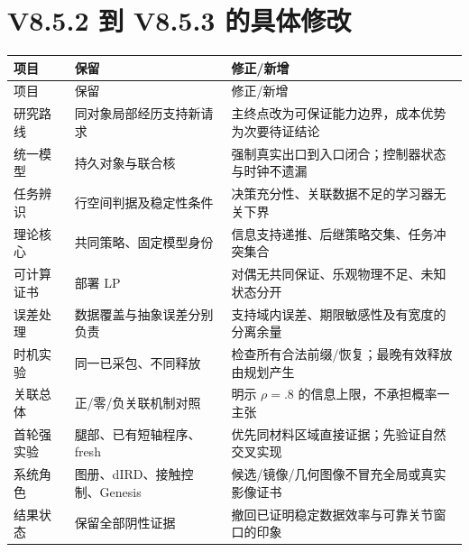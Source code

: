 \documentclass[11pt,a4paper,fontset=fandol]{ctexart}
\theoremstyle{definition}
\theoremstyle{remark}\newtheorem{remark}[theorem]{说明}
\numberwithin{equation}{section}
\begin{document}
\section{V8.5.2 到 V8.5.3 的具体修改}
\begin{longtable}{P{.24\linewidth}P{.33\linewidth}P{.33\linewidth}}
\toprule
项目 & 保留 & 修正/新增\\\midrule
\endfirsthead
\toprule 项目 & 保留 & 修正/新增\\\midrule
\endhead
研究路线 & 同对象局部经历支持新请求 & 主终点改为可保证能力边界，成本优势为次要待证结论\\
统一模型 & 持久对象与联合核 & 强制真实出口到入口闭合；控制器状态与时钟不遗漏\\
任务辨识 & 行空间判据及稳定性条件 & 决策充分性、关联数据不足的学习器无关下界\\
理论核心 & 共同策略、固定模型身份 & 信息支持递推、后继策略交集、任务冲突集合\\
可计算证书 & 部署 LP & 对偶无共同保证、乐观物理不足、未知状态分开\\
误差处理 & 数据覆盖与抽象误差分别负责 & 支持域内误差、期限敏感性及有宽度的分离余量\\
时机实验 & 同一已采包、不同释放 & 检查所有合法前缀/恢复；最晚有效释放由规划产生\\
关联总体 & 正/零/负关联机制对照 & 明示 $\rho=.8$ 的信息上限，不承担概率一主张\\
首轮强实验 & 腿部、已有短轴程序、fresh & 优先同材料区域直接证据；先验证自然交叉实现\\
系统角色 & 图册、dIRD、接触控制、Genesis & 候选/镜像/几何图像不冒充全局或真实影像证书\\
结果状态 & 保留全部阴性证据 & 撤回已证明稳定数据效率与可靠关节窗口的印象\\
\bottomrule
\end{longtable}
\end{document}
